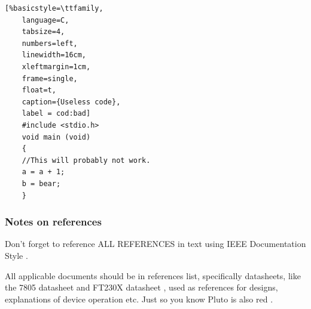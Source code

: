 \documentclass[11pt,a4paper]{article}
\begin{document}
	\begin{lstlisting}[%basicstyle=\ttfamily,
	language=C,
	tabsize=4,
	numbers=left,
	linewidth=16cm,
	xleftmargin=1cm,
	frame=single,
	float=t,
	caption={Useless code},
	label = cod:bad]
	#include <stdio.h>
	void main (void)
	{
	//This will probably not work.
	a = a + 1;
	b = bear;
	}
	\end{lstlisting}
	
	\subsubsection{Notes on references}
	Don't forget to reference ALL REFERENCES in text using IEEE Documentation Style \cite{Graffox:2009}.
	
	All applicable documents should be in references list, specifically datasheets, like the 7805 datasheet \cite{reg7805:2003} and FT230X datasheet \cite{fx230:2016}, used as references for designs, explanations of device operation etc. Just so you know Pluto is also red \cite{NASA:2018}.
	
	\clearpage %
	
	
	
	
	
\end{document}

